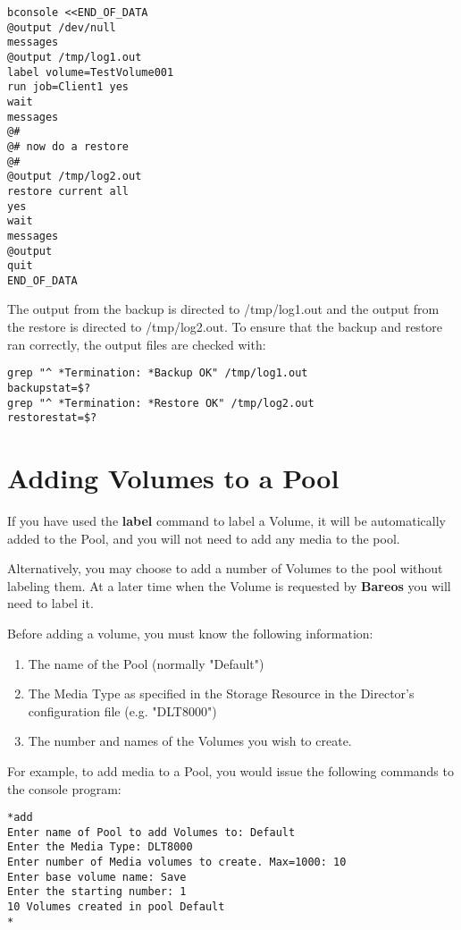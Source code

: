 \footnotesize
\begin{verbatim}
bconsole <<END_OF_DATA
@output /dev/null
messages
@output /tmp/log1.out
label volume=TestVolume001
run job=Client1 yes
wait
messages
@#
@# now do a restore
@#
@output /tmp/log2.out
restore current all
yes
wait
messages
@output
quit
END_OF_DATA
\end{verbatim}
\normalsize

The output from the backup is directed to /tmp/log1.out and the output from
the restore is directed to /tmp/log2.out. To ensure that the backup and
restore ran correctly, the output files are checked with:

\footnotesize
\begin{verbatim}
grep "^ *Termination: *Backup OK" /tmp/log1.out
backupstat=$?
grep "^ *Termination: *Restore OK" /tmp/log2.out
restorestat=$?
\end{verbatim}
\normalsize

\section{Adding Volumes to a Pool}

If you have used the {\bf label} command to label a Volume, it will be
automatically added to the Pool, and you will not need to add any media to the
pool.

Alternatively, you may choose to add a number of Volumes to the pool without
labeling them. At a later time when the Volume is requested by {\bf Bareos}
you will need to label it.

Before adding a volume, you must know the following information:

\begin{enumerate}
\item The name of the Pool (normally "Default")
\item The Media Type as specified in the Storage Resource  in the Director's
   configuration file (e.g. "DLT8000")
\item The number and names of the Volumes you wish to create.
\end{enumerate}

For example, to add media to a Pool, you would issue the following commands to
the console program:

\footnotesize
\begin{verbatim}
*add
Enter name of Pool to add Volumes to: Default
Enter the Media Type: DLT8000
Enter number of Media volumes to create. Max=1000: 10
Enter base volume name: Save
Enter the starting number: 1
10 Volumes created in pool Default
*
\end{verbatim}
\normalsize

